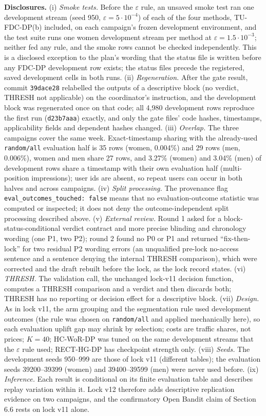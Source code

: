 \documentclass[sigconf,anonymous,review]{acmart}
\newcommand{\eps}{\varepsilon}
\begin{document}
\textbf{Disclosures.} (i) \emph{Smoke tests.} Before the $\eps$ rule, an unsaved smoke test ran one development stream (seed 950, $\eps = 5 \cdot 10^{-4}$) of each of the four methods, TU-FDC-DP(b) included, on each campaign's frozen development environment, and the test suite runs one women development stream per method at $\eps = 1.5 \cdot 10^{-3}$; neither fed any rule, and the smoke rows cannot be checked independently. This is a disclosed exception to the plan's wording that the status file is written before any FDC-DP development row exists; the status files precede the registered, saved development cells in both runs. (ii) \emph{Regeneration.} After the gate result, commit \texttt{39dace28} relabelled the outputs of a descriptive block (no verdict, THRESH not applicable) on the coordinator's instruction, and the development block was regenerated once on that code; all 4,980 development rows reproduce the first run (\texttt{d23b7aaa}) exactly, and only the gate files' code hashes, timestamps, applicability fields and dependent hashes changed. (iii) \emph{Overlap.} The three campaigns cover the same week. Exact-timestamp sharing with the already-used \texttt{random/all} evaluation half is 35 rows (women, 0.004\%) and 29 rows (men, 0.006\%), women and men share 27 rows, and 3.27\% (women) and 3.04\% (men) of development rows share a timestamp with their own evaluation half (multi-position impressions); user ids are absent, so repeat users can occur in both halves and across campaigns. (iv) \emph{Split processing.} The provenance flag \texttt{eval\_outcomes\_touched: false} means that no evaluation-outcome statistic was computed or inspected; it does not deny the outcome-independent split processing described above. (v) \emph{External review.} Round 1 asked for a block-status-conditional verdict contract and more precise blinding and chronology wording (one P1, two P2); round 2 found no P0 or P1 and returned ``fix-then-lock'' for two residual P2 wording errors (an unqualified pre-lock no-access sentence and a sentence denying the internal THRESH comparison), which were corrected and the draft rebuilt before the lock, as the lock record states. (vi) \emph{THRESH.} The validation call, the unchanged lock-v11 decision function, computes a THRESH comparison and a verdict and then discards both; THRESH has no reporting or decision effect for a descriptive block. (vii) \emph{Design.} As in lock v11, the arm grouping and the segmentation rule used development outcomes (the rule was chosen on \texttt{random/all} and applied mechanically here), so each evaluation uplift gap may shrink by selection; costs are traffic shares, not prices; $K = 40$; HC-WoR-DP was tuned on the same development streams that the $\eps$ rule used; RECT-HG-DP has checkpoint strength only. (viii) \emph{Seeds.} The development seeds 950--999 are those of lock v11 (different tables); the evaluation seeds 39200--39399 (women) and 39400--39599 (men) were never used before. (ix) \emph{Inference.} Each result is conditional on its finite evaluation table and describes replay variation within it. Lock v12 therefore adds descriptive replication evidence on two campaigns, and the confirmatory Open Bandit claim of Section 6.6 rests on lock v11 alone.

\clearpage
\end{document}
